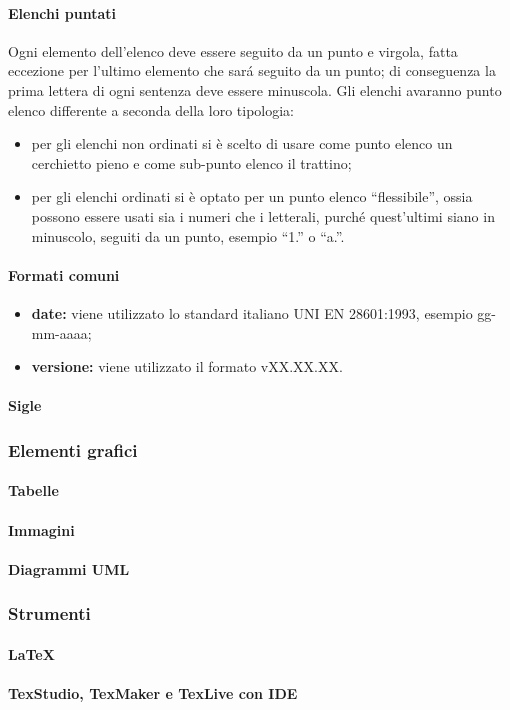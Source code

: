 			\paragraph{Elenchi puntati}
				Ogni elemento dell'elenco deve essere seguito da un punto e virgola, fatta eccezione per l'ultimo elemento che sará seguito da un punto; di conseguenza la prima lettera di ogni sentenza deve essere minuscola. Gli elenchi avaranno punto elenco differente a seconda della loro tipologia:
				\begin{itemize}
					\item per gli elenchi non ordinati si è scelto di usare come punto elenco un cerchietto pieno e come sub-punto elenco il trattino;
					\item per gli elenchi ordinati si è optato per un punto elenco ``flessibile'', ossia possono essere usati sia i numeri che i letterali, purché quest'ultimi siano in minuscolo, seguiti da un punto, esempio ``1.'' o ``a.''.
				\end{itemize}
			\paragraph{Formati comuni}
				\begin{itemize}
					\item \textbf{date:} viene utilizzato lo standard italiano UNI EN 28601:1993, esempio gg-mm-aaaa;
					\item \textbf{versione:} viene utilizzato il formato vXX.XX.XX.
				\end{itemize}
			\paragraph{Sigle}

		\subsubsection{Elementi grafici}
			\paragraph{Tabelle}
			\paragraph{Immagini}
			\paragraph{Diagrammi UML}

		\subsubsection{Strumenti}
			\paragraph{LaTeX}
			\paragraph{TexStudio, TexMaker e TexLive con IDE}
